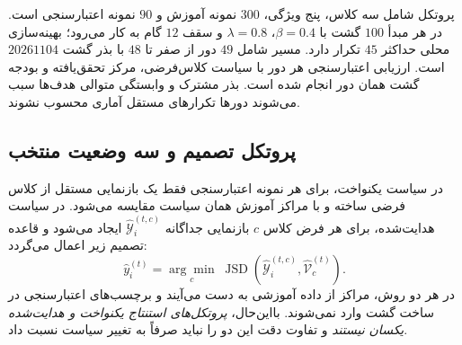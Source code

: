 پروتکل شامل سه کلاس، پنج ویژگی، $300$ نمونه آموزش
و $90$ نمونه اعتبارسنجی است. در هر مبدأ $100$ گشت
با $\beta=0.4$، $\lambda=0.8$ و سقف $12$ گام
به کار می‌رود؛ بهینه‌سازی محلی حداکثر $45$ تکرار
 دارد. مسیر شامل $49$ دور
از صفر تا $48$ با بذر گشت $20261104$ است.
ارزیابی اعتبارسنجی هر دور با سیاست کلاس‌فرضی،
مرکز تحقق‌یافته و بودجه گشت همان دور انجام شده است.
بذر مشترک و وابستگی متوالی هدف‌ها سبب می‌شوند
دورها تکرارهای مستقل آماری محسوب نشوند.

\subsection{پروتکل تصمیم و سه وضعیت منتخب}
\label{subsec:ch4-center-observation-cases}
در سیاست یکنواخت، برای هر نمونه اعتبارسنجی فقط یک بازنمایی مستقل از کلاس فرضی ساخته و با مراکز آموزش همان سیاست مقایسه می‌شود. در سیاست هدایت‌شده، برای هر فرض کلاس $c$ بازنمایی جداگانه $\widehat{\mathscr Y}_i^{(t,c)}$ ایجاد می‌شود و قاعده تصمیم زیر اعمال می‌گردد:
\begin{equation}\label{eq:ch4-center-observation-decision}
\widehat y_i^{(t)}=
\underset{c}{\arg\min}\;
\operatorname{JSD}\left(
\widehat{\mathscr Y}_i^{(t,c)},\widehat{\mathcal V}_c^{(t)}\right).
\end{equation}
در هر دو روش، مراکز از داده آموزشی به دست می‌آیند و برچسب‌های اعتبارسنجی در ساخت گشت وارد نمی‌شوند. بااین‌حال، \emph{پروتکل‌های استنتاج یکنواخت و هدایت‌شده یکسان نیستند} و تفاوت دقت این دو را نباید صرفاً به تغییر سیاست نسبت داد.

